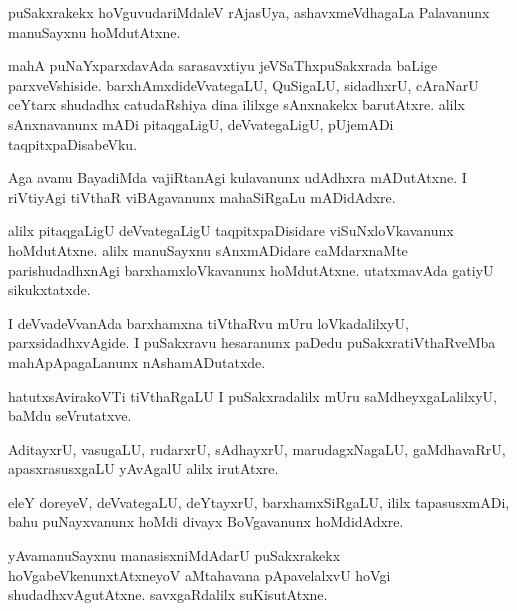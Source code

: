 \documentclass{article}
\begin{document}
\begin{mn}
puSakxrakekx  hoVguvudariMdaleV  rAjasUya,  ashavxmeVdhagaLa  Palavanunx  manuSayxnu  hoMdutAtxne.
\end{mn}

\begin{mn}
mahA  puNaYxparxdavAda  sarasavxtiyu  jeVSaThxpuSakxrada  baLige  parxveVshiside.  
barxhAmxdideVvategaLU,  QuSigaLU,  sidadhxrU,  cAraNarU  ceYtarx shudadhx  
catudaRshiya  dina  ililxge  sAnxnakekx  barutAtxre.  alilx  sAnxnavanunx  
mADi  pitaqgaLigU,  deVvategaLigU,  pUjemADi  taqpitxpaDisabeVku.
\end{mn}

\begin{mn}
Aga  avanu  BayadiMda  vajiRtanAgi  kulavanunx  udAdhxra  mADutAtxne.  
I riVtiyAgi  tiVthaR viBAgavanunx  mahaSiRgaLu  mADidAdxre.
\end{mn}

\begin{mn}
alilx  pitaqgaLigU  deVvategaLigU  taqpitxpaDisidare  viSuNxloVkavanunx  
hoMdutAtxne.  alilx  manuSayxnu  sAnxmADidare  caMdarxnaMte  parishudadhxnAgi  
barxhamxloVkavanunx  hoMdutAtxne.  utatxmavAda  gatiyU  sikukxtatxde. 
\end{mn}

\begin{mn}
I deVvadeVvanAda  barxhamxna  tiVthaRvu  mUru  loVkadalilxyU,  parxsidadhxvAgide.  
I  puSakxravu  hesaranunx  paDedu  puSakxratiVthaRveMba  mahApApagaLanunx  nAshamADutatxde.
\end{mn}

\begin{mn}
hatutxsAvirakoVTi  tiVthaRgaLU  I  puSakxradalilx  mUru  saMdheyxgaLalilxyU,  baMdu  seVrutatxve.
\end{mn}

\begin{mn}
AditayxrU,  vasugaLU,  rudarxrU,  sAdhayxrU,  marudagxNagaLU,  gaMdhavaRrU,  
apasxrasusxgaLU  yAvAgalU  alilx  irutAtxre.
\end{mn}

\begin{mn}
eleY doreyeV,  deVvategaLU,  deYtayxrU,  barxhamxSiRgaLU,  ililx  tapasusxmADi,  
bahu  puNayxvanunx  hoMdi  divayx BoVgavanunx  hoMdidAdxre.
\end{mn}

\begin{mn}
yAvamanuSayxnu  manasisxniMdAdarU  puSakxrakekx  hoVgabeVkenunxtAtxneyoV  
aMtahavana  pApavelalxvU  hoVgi  shudadhxvAgutAtxne.  savxgaRdalilx  suKisutAtxne.
\end{mn}
\end{document}
